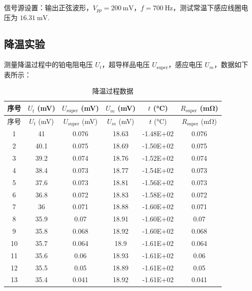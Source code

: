 \documentclass{THUexprep}
\begin{document}
信号源设置：输出正弦波形，$V_{pp}=\SI{200}{\milli\volt}$，$f=\SI{700}{\hertz}$，测试常温下感应线圈电压为 $\SI{16.31}{\milli\volt}$.

\subsection{降温实验}

测量降温过程中的铂电阻电压 $U_t$，超导样品电压 $U_\text{super}$，感应电压 $U_m$，数据如下表所示：

\begin{longtable}{|c|c|c|c|c|c|}
    \caption{降温过程数据} \\
    \hline
    序号 & $U_t$ (\si{\milli\volt}) & $U_{\text{super}}$ (\si{\milli\volt})  & $U_m$ (\si{\milli\volt}) & $t$ (\si{\celsius})    & $R_\text{super}$ (\si{\milli\ohm}) \\
    \hline
    \endfirsthead
    \hline
    序号 & $U_t$ (\si{\milli\volt}) & $U_{\text{super}}$ (\si{\milli\volt})  & $U_m$ (\si{\milli\volt}) & $t$ (\si{\celsius})    & $R_\text{super}$ (\si{\milli\ohm}) \\
    \hline
    \endhead
    1     & 41    & 0.076 & 18.63 & -1.48E+02 & 0.076 \\
    \hline
    2     & 40.1  & 0.075 & 18.69 & -1.50E+02 & 0.075 \\
    \hline
    3     & 39.2  & 0.074 & 18.76 & -1.52E+02 & 0.074 \\
    \hline
    4     & 38.4  & 0.073 & 18.77 & -1.54E+02 & 0.073 \\
    \hline
    5     & 37.6  & 0.073 & 18.81 & -1.56E+02 & 0.073 \\
    \hline
    6     & 36.8  & 0.072 & 18.83 & -1.58E+02 & 0.072 \\
    \hline
    7     & 36    & 0.071 & 18.88 & -1.60E+02 & 0.071 \\
    \hline
    8     & 35.9  & 0.07  & 18.91 & -1.60E+02 & 0.07 \\
    \hline
    9     & 35.8  & 0.068 & 18.92 & -1.60E+02 & 0.068 \\
    \hline
    10    & 35.7  & 0.064 & 18.9  & -1.61E+02 & 0.064 \\
    \hline
    11    & 35.6  & 0.06  & 18.93 & -1.61E+02 & 0.06 \\
    \hline
    12    & 35.5  & 0.05  & 18.89 & -1.61E+02 & 0.05 \\
    \hline
    13    & 35.4  & 0.041 & 18.92 & -1.61E+02 & 0.041 \\

\end{longtable}
\end{document}
